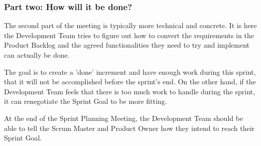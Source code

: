 \subsubsection{Part two: How will it be done?}

The second part of the meeting is typically more technical and concrete. It is here the 
Development Team tries to figure out how to convert the requirements in the Product Backlog 
and the agreed functionalities they need to try and implement can actually be 
done\cite{scrumguide11}. 


The goal is to create a 'done' increment and have enough work during this sprint, that it 
will not be accomplished before the sprint's end\cite{scrumguide11}. On the other hand, if 
the Development Team feels that there is too much work to handle during the sprint, it can 
renegotiate the Sprint Goal to be more fitting\cite{scrumguide11}.


At the end of the Sprint Planning Meeting, the Development Team should be able to tell the 
Scrum Master and Product Owner how they intend to reach their Sprint Goal.